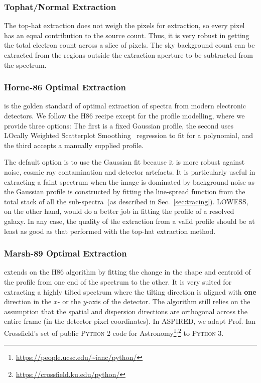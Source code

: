 \documentclass[linenumbers, twocolumn]{aastex631}
\begin{document}
\subsubsection*{Tophat/Normal Extraction}
\label{sec:tophat}
The top-hat extraction does not weigh the pixels for extraction,
so every pixel has an equal contribution to the source count. Thus,
it is very robust in getting the total electron count across
a slice of pixels. The sky background count can be extracted
from the regions outside the extraction aperture to be
subtracted from the spectrum.

\subsubsection*{Horne-86 Optimal Extraction}
\citet[hereafter H86]{1986PASP...98..609H} is the golden standard
of optimal extraction of spectra from modern electronic detectors.
We follow the H86 recipe except for the profile modelling,
where we provide three options: The first is a fixed Gaussian
profile, the second uses LOcally Weighted Scatterplot
Smoothing~\citep[LOWESS]{doi:10.1080/01621459.1979.10481038}
regression to fit for a polynomial, and the third accepts
a manually supplied profile.

The default option is to use the Gaussian fit because it is
more robust against noise, cosmic ray contamination and detector
artefacts. It is particularly useful in extracting a faint
spectrum when the image is dominated by background noise as the
Gaussian profile is constructed by fitting the line-spread
function from the total stack of all the
sub-spectra~(as described in Sec.~\ref{sec:tracing}).
LOWESS, on the other hand, would do a better job in fitting
the profile of a resolved galaxy. In any case, the quality
of the extraction from a valid profile should be at least as
good as that performed with the top-hat extraction method.

\subsubsection*{Marsh-89 Optimal Extraction}
\citet[hereafter M89]{1989PASP..101.1032M} extends on the H86 algorithm by
fitting the change in the shape and centroid of the profile from one end of the
spectrum to the other. It is very suited for extracting a highly tilted
spectrum where the tilting direction is aligned with \textbf{one} direction in
the $x$- or the $y$-axis of the detector. The algorithm still relies on the
assumption that the spatial and dispersion directions are orthogonal across
the entire frame (in the detector pixel coordinates). In \textsc{ASPIRED}, we
adapt Prof. Ian Crossfield's set of public \textsc{Python 2} code for
Astronomy\footnote{\url{https://people.ucsc.edu/~ianc/python/}}$^,$\footnote{\url{https://crossfield.ku.edu/python/}}
to \textsc{Python 3}.
\end{document}
